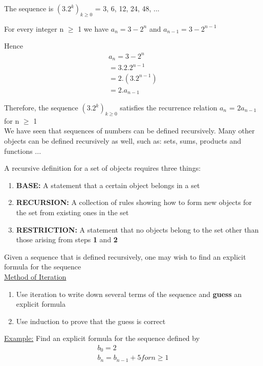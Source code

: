 \documentclass{article}
\begin{document}
The sequence is $(3.2^{k})_{k\geq0}$ = 3, 6, 12, 24, 48, ...

For every integer n $\geq$ 1 we have $a_{n} = 3 - 2^{n}$ and $a_{n-1} = 3 - 2^{n-1}$ 

Hence 
\begin{align}
a_{n} = 3 - 2^{n} \\
= 3.2.2^{n-1} \\
= 2.(3.2^{n-1}) \\
= 2.a_{n-1}
\end{align}

Therefore, the sequence $(3.2^{k})_{k\geq0}$ satisfies the recurrence relation $a_{n}$ = $2a_{n-1}$ for n $\geq$ 1 \\

We have seen that sequences of numbers can be defined recursively. Many other objects can be defined recursively as well, such as: sets, sums, products and functions ...

A recursive definition for a set of objects requires three things:
\begin{enumerate}
\item \textbf{BASE:} A statement that a certain object belongs in a set
\item \textbf{RECURSION:} A collection of rules showing how to form new objects for the set from existing ones in the set
\item \textbf{RESTRICTION:} A statement that no objects belong to the set other than those arising from steps \textbf{1} and \textbf{2}
\end{enumerate}

Given a sequence that is defined recursively, one may wish to find an explicit formula for the sequence \\

\underline{Method of Iteration} \\

\begin{enumerate}
\item Use iteration to write down several terms of the sequence and \textbf{guess} an explicit formula
\item Use induction to prove that the guess is correct
\end{enumerate}

\underline{Example:} Find an explicit formula for the sequence defined by 
\begin{align}
b_{0} = 2 \\
b_{n} = b_{n-1} + 5 for n \geq 1
\end{align}
\end{document}
